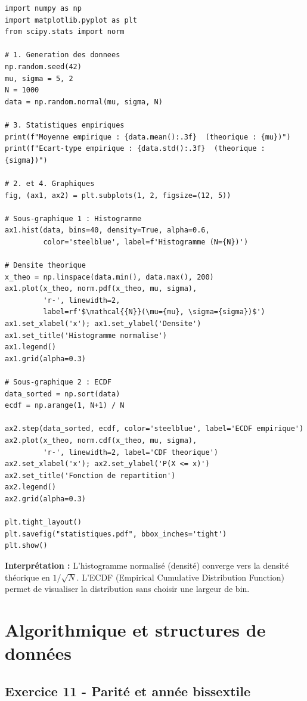 \documentclass[12pt,a4paper]{article}
\begin{document}
\begin{boitecorrige}
\begin{lstlisting}
import numpy as np
import matplotlib.pyplot as plt
from scipy.stats import norm

# 1. Generation des donnees
np.random.seed(42)
mu, sigma = 5, 2
N = 1000
data = np.random.normal(mu, sigma, N)

# 3. Statistiques empiriques
print(f"Moyenne empirique : {data.mean():.3f}  (theorique : {mu})")
print(f"Ecart-type empirique : {data.std():.3f}  (theorique : {sigma})")

# 2. et 4. Graphiques
fig, (ax1, ax2) = plt.subplots(1, 2, figsize=(12, 5))

# Sous-graphique 1 : Histogramme
ax1.hist(data, bins=40, density=True, alpha=0.6,
         color='steelblue', label=f'Histogramme (N={N})')

# Densite theorique
x_theo = np.linspace(data.min(), data.max(), 200)
ax1.plot(x_theo, norm.pdf(x_theo, mu, sigma),
         'r-', linewidth=2,
         label=rf'$\mathcal{{N}}(\mu={mu}, \sigma={sigma})$')
ax1.set_xlabel('x'); ax1.set_ylabel('Densite')
ax1.set_title('Histogramme normalise')
ax1.legend()
ax1.grid(alpha=0.3)

# Sous-graphique 2 : ECDF
data_sorted = np.sort(data)
ecdf = np.arange(1, N+1) / N

ax2.step(data_sorted, ecdf, color='steelblue', label='ECDF empirique')
ax2.plot(x_theo, norm.cdf(x_theo, mu, sigma),
         'r-', linewidth=2, label='CDF theorique')
ax2.set_xlabel('x'); ax2.set_ylabel('P(X <= x)')
ax2.set_title('Fonction de repartition')
ax2.legend()
ax2.grid(alpha=0.3)

plt.tight_layout()
plt.savefig("statistiques.pdf", bbox_inches='tight')
plt.show()
\end{lstlisting}

\textbf{Interprétation :} L'histogramme normalisé (densité) converge vers la densité théorique en $1/\sqrt{N}$. L'ECDF (Empirical Cumulative Distribution Function) permet de visualiser la distribution sans choisir une largeur de bin.
\end{boitecorrige}

\section{Algorithmique et structures de données}

\subsection*{Exercice 11 - Parité et année bissextile \niveau{\facile}}
\end{document}
